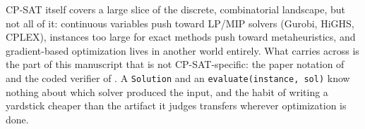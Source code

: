 CP-SAT itself covers a large slice of the discrete, combinatorial
landscape, but not all of it: continuous variables push toward LP/MIP
solvers (Gurobi, HiGHS, CPLEX), instances too large for exact methods
push toward metaheuristics, and gradient-based optimization lives in
another world entirely. What carries across is the part of this
manuscript that is not CP-SAT-specific: the paper notation of  and the coded verifier of . A
\lstinline!Solution! and an
\lstinline!evaluate(instance, sol)! know nothing about
which solver produced the input, and the habit of writing a yardstick
cheaper than the artifact it judges transfers wherever optimization is
done.
